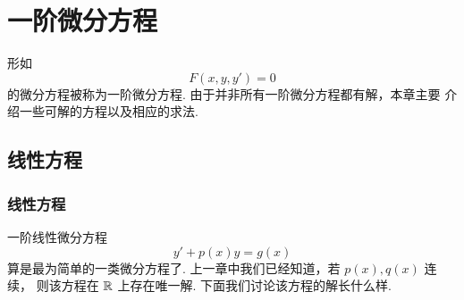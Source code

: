 \chapter{一阶微分方程}
形如
\[
F(x,y,y')=0
\]
的微分方程被称为一阶微分方程. 由于并非所有一阶微分方程都有解，本章主要
介绍一些可解的方程以及相应的求法.

\section{线性方程}\label{sec:2.1}
\subsection{线性方程}
一阶线性微分方程
\[
y'+p(x)y=g(x)
\]
算是最为简单的一类微分方程了. 上一章中我们已经知道，若 $p(x),q(x)$ 连续，
则该方程在 $\mathbb{R}$ 上存在唯一解. 下面我们讨论该方程的解长什么样.

